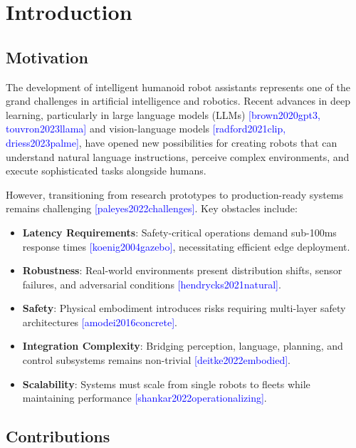 \documentclass[conference]{IEEEtran}
\newcommand{\cite}[1]{\textcolor{blue}{[#1]}}
\begin{document}
\section{Introduction}

\subsection{Motivation}

The development of intelligent humanoid robot assistants represents one of the grand challenges in artificial intelligence and robotics. Recent advances in deep learning, particularly in large language models (LLMs) \cite{brown2020gpt3, touvron2023llama} and vision-language models \cite{radford2021clip, driess2023palme}, have opened new possibilities for creating robots that can understand natural language instructions, perceive complex environments, and execute sophisticated tasks alongside humans.

However, transitioning from research prototypes to production-ready systems remains challenging \cite{paleyes2022challenges}. Key obstacles include:

\begin{itemize}
    \item \textbf{Latency Requirements}: Safety-critical operations demand sub-100ms response times \cite{koenig2004gazebo}, necessitating efficient edge deployment.
    \item \textbf{Robustness}: Real-world environments present distribution shifts, sensor failures, and adversarial conditions \cite{hendrycks2021natural}.
    \item \textbf{Safety}: Physical embodiment introduces risks requiring multi-layer safety architectures \cite{amodei2016concrete}.
    \item \textbf{Integration Complexity}: Bridging perception, language, planning, and control subsystems remains non-trivial \cite{deitke2022embodied}.
    \item \textbf{Scalability}: Systems must scale from single robots to fleets while maintaining performance \cite{shankar2022operationalizing}.
\end{itemize}

\subsection{Contributions}
\end{document}
